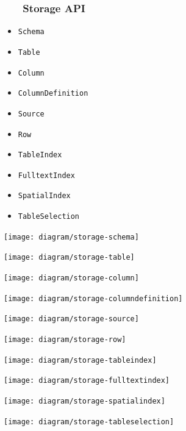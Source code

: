 \documentclass[
]{beamer}
\newcommand{\slidetitle}[2]{\frametitle{{\small #1 ~ \ding{226} ~ } \normalsize \textbf{#2} }}
\begin{document}
\begin{frame}
    \slidetitle{\sectionshorttitle}{Storage API}
    
    
    \begin{minipage}[c]{0.5\textwidth}
        \begin{itemize}
            \item {  \texttt{Schema} }
            \item {  \texttt{Table} }
            \item {  \texttt{Column} }
            \item {  \texttt{ColumnDefinition} }
            \item {  \texttt{Source} }
            \item {  \texttt{Row} }
            \item {  \texttt{TableIndex} }
            \item {  \texttt{FulltextIndex} }
            \item {  \texttt{SpatialIndex} }
            \item {  \texttt{TableSelection} }
        \end{itemize}
    \end{minipage}%
    \begin{minipage}[c]{0.5\textwidth}
        \begin{overprint}
            \centerline{\texttt{[image: diagram/storage-schema]}}
            \centerline{\texttt{[image: diagram/storage-table]}}
            \centerline{\texttt{[image: diagram/storage-column]}}
            \centerline{\texttt{[image: diagram/storage-columndefinition]}}
            \centerline{\texttt{[image: diagram/storage-source]}}
            \centerline{\texttt{[image: diagram/storage-row]}}
            \centerline{\texttt{[image: diagram/storage-tableindex]}}
            \centerline{\texttt{[image: diagram/storage-fulltextindex]}}
            \centerline{\texttt{[image: diagram/storage-spatialindex]}}
            \centerline{\texttt{[image: diagram/storage-tableselection]}}
        \end{overprint}
    \end{minipage}
\end{frame}
\end{document}
